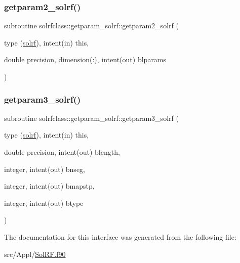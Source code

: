 \mbox{\label{interfacesolrfclass_1_1getparam__solrf_a894679e72c2fec5d213c1e22bcada11f}} 
\subsubsection{\texorpdfstring{getparam2\_solrf()}{getparam2\_solrf()}}
{\footnotesize\ttfamily subroutine solrfclass\+::getparam\+\_\+solrf\+::getparam2\+\_\+solrf (\begin{DoxyParamCaption}\item[{type (\mbox{\hyperlink{namespacesolrfclass_structsolrfclass_1_1solrf}{solrf}}), intent(in)}]{this,  }\item[{double precision, dimension(\+:), intent(out)}]{blparams }\end{DoxyParamCaption})}

\mbox{\label{interfacesolrfclass_1_1getparam__solrf_aadb158194b1a47f87f42e77f748356bb}} 
\subsubsection{\texorpdfstring{getparam3\_solrf()}{getparam3\_solrf()}}
{\footnotesize\ttfamily subroutine solrfclass\+::getparam\+\_\+solrf\+::getparam3\+\_\+solrf (\begin{DoxyParamCaption}\item[{type (\mbox{\hyperlink{namespacesolrfclass_structsolrfclass_1_1solrf}{solrf}}), intent(in)}]{this,  }\item[{double precision, intent(out)}]{blength,  }\item[{integer, intent(out)}]{bnseg,  }\item[{integer, intent(out)}]{bmapstp,  }\item[{integer, intent(out)}]{btype }\end{DoxyParamCaption})}



The documentation for this interface was generated from the following file\+:\begin{DoxyCompactItemize}
\item 
src/\+Appl/\mbox{\hyperlink{_sol_r_f_8f90}{Sol\+R\+F.\+f90}}\end{DoxyCompactItemize}
